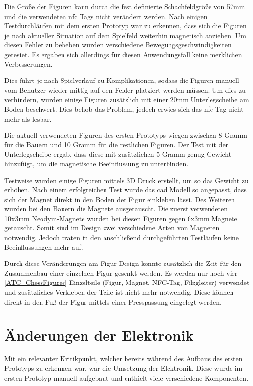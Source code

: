 Die Größe der Figuren kann durch die fest definierte Schachfeldgröße von
57mm und die verwendeten \gls{nfc} Tags nicht verändert werden. Nach
einigen Testdurchläufen mit dem ersten Prototyp war zu erkennen, dass
sich die Figuren je nach aktueller Situation auf dem Spielfeld weiterhin
magnetisch anziehen. Um diesen Fehler zu beheben wurden verschiedene
Bewegungsgeschwindigkeiten getestet. Es ergaben sich allerdings für
diesen Anwendungsfall keine merklichen Verbesserungen.

Dies führt je nach Spielverlauf zu Komplikationen, sodass die Figuren
manuell vom Benutzer wieder mittig auf den Felder platziert werden
müssen. Um dies zu verhindern, wurden einige Figuren zusätzlich mit
einer 20mm Unterlegscheibe am Boden beschwert. Dies behob das Problem,
jedoch erwies sich das \gls{nfc} Tag nicht mehr als lesbar.

Die aktuell verwendeten Figuren des ersten Prototyps wiegen zwischen 8
Gramm für die Bauern und 10 Gramm für die restlichen Figuren. Der Test
mit der Unterlegscheibe ergab, dass diese mit zusätzlichen 5 Gramm genug
Gewicht hinzufügt, um die magnetische Beeinflussung zu unterbinden.

Testweise wurden einige Figuren mittels 3D Druck erstellt, um so das
Gewicht zu erhöhen. Nach einem erfolgreichen Test wurde das \gls{cad}
Modell so angepasst, dass sich der Magnet direkt in den Boden der Figur
einkleben lässt. Des Weiteren wurden bei den Bauern die Magnete
ausgetauscht. Die zuerst verwendeten 10x3mm Neodym-Magnete wurden bei
diesen Figuren gegen 6x3mm Magnete getauscht. Somit sind im Design zwei
verschiedene Arten von Magneten notwendig. Jedoch traten in den
anschließend durchgeführten Testläufen keine Beeinflussungen mehr auf.

Durch diese Veränderungen am Figur-Design konnte zusätzlich die Zeit für
den Zusammenbau einer einzelnen Figur gesenkt werden. Es werden nur noch
vier \ref{ATC_ChessFigures} Einzelteile (Figur, Magnet, NFC-Tag,
Filzgleiter) verwendet und zusätzliches Verkleben der Teile ist nicht
mehr notwendig. Diese können direkt in den Fuß der Figur mittels einer
Presspassung eingelegt werden.

\hypertarget{uxe4nderungen-der-elektronik}{%
\section{Änderungen der Elektronik}\label{uxe4nderungen-der-elektronik}}

Mit ein relevanter Kritikpunkt, welcher bereits während des Aufbaus des
ersten Prototyps zu erkennen war, war die Umsetzung der Elektronik.
Diese wurde im ersten Prototyp manuell aufgebaut und enthielt viele
verschiedene Komponenten.

